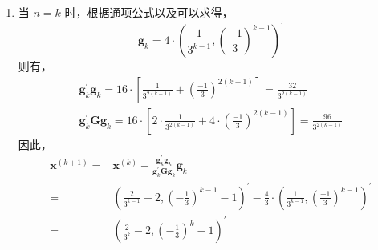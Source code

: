 \documentclass[cn,mtpro2,12pt]{elegantbook}
\begin{document}
\begin{solution}
\begin{enumerate}
        \item 当 $n=k$ 时，根据通项公式以及可以求得，
              \begin{equation}
                  \mathbf{g}_{k}=4\cdot\left(\frac{1}{3^{k-1}},\left(\frac{-1}{3}\right)^{k-1}\right)^{\prime}
              \end{equation}
              则有，
              \begin{gather*}
                  \mathbf{g}_{k}^{\prime}\mathbf{g}_{k}=16\cdot\left[\frac{1}{3^{2(k-1)}}+\left(\frac{-1}{3}\right)^{2(k-1)}\right]=\frac{32}{3^{2(k-1)}}\\
                  \mathbf{g}_{k}^{\prime}\mathbf{G}\mathbf{g}_{k}=16\cdot\left[2\cdot\frac{1}{3^{2(k-1)}}+4\cdot\left(\frac{-1}{3}\right)^{2(k-1)}\right]=\frac{96}{3^{2(k-1)}}
              \end{gather*}
              因此，
              \begin{equation}
                  \begin{aligned}
                      \mathbf{x}^{(k+1)}= & \mathbf{x}^{(k)}-\frac{\mathbf{g}_{k}^{\prime}\mathbf{g}_{k}}{\mathbf{g}_{k}^{\prime}\mathbf{G}\mathbf{g}_{k}}\mathbf{g}_{k}                                        \\
                      =                   & \left(\frac{2}{3^{k-1}}-2,\left(-\frac{1}{3}\right)^{k-1}-1\right)^{\prime}-\frac{4}{3}\cdot\left(\frac{1}{3^{k-1}},\left(\frac{-1}{3}\right)^{k-1}\right)^{\prime} \\
                      =                   & \left(\frac{2}{3^{k}}-2,\left(-\frac{1}{3}\right)^{k}-1\right)^{\prime}
                  \end{aligned}
              \end{equation}
    \end{enumerate}
\end{solution}

\begin{exercise}

\end{exercise}
\end{document}
